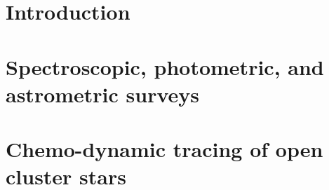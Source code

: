 





\pagestyle{fancy}
\fancyhead[CE,RE]{}
\fancyhead[LO,CO]{}
\fancyhead[LE]{\textbf{\nouppercase{\leftmark}}}
\fancyhead[RO]{\textbf{\nouppercase{\rightmark}}}


\chapter{Introduction}


\chapter{Spectroscopic, photometric, and astrometric surveys}


\chapter{Chemo-dynamic tracing of open cluster stars}


